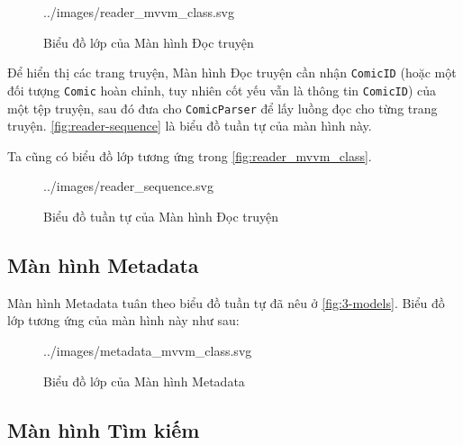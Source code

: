 \documentclass[../../../../thesis]{subfiles}
\begin{document}
\begin{wrapfigure}[8]{r}{10cm}
    \centering
    
        {../images/reader_mvvm_class.svg}
    \caption{Biểu đồ lớp của Màn hình Đọc truyện}
    \label{fig:reader_mvvm_class}
\end{wrapfigure}

Để hiển thị các trang truyện, Màn hình Đọc truyện cần nhận \texttt{ComicID}
(hoặc một đối tượng \texttt{Comic} hoàn chỉnh, tuy nhiên cốt yếu vẫn là thông
tin \texttt{ComicID}) của một tệp truyện, sau đó đưa cho \texttt{ComicParser} để
lấy luồng đọc cho từng trang truyện. \autoref{fig:reader-sequence} là biểu đồ
tuần tự của màn hình này.

Ta cũng có biểu đồ lớp tương ứng trong \autoref{fig:reader_mvvm_class}.

\begin{figure}[H]
    \centering
    
        {../images/reader_sequence.svg}
    \caption{Biểu đồ tuần tự của Màn hình Đọc truyện}
    \label{fig:reader-sequence}
\end{figure}



\subsection{Màn hình Metadata}\label{sec:metadata-design}

Màn hình Metadata tuân theo biểu đồ tuần tự đã nêu ở \autoref{fig:3-models}.
Biểu đồ lớp tương ứng của màn hình này như sau:

\begin{figure}[H]
    \centering
    
        {../images/metadata_mvvm_class.svg}
    \caption{Biểu đồ lớp của Màn hình Metadata}
    \label{fig:metadata_mvvm_class}
\end{figure}



\subsection{Màn hình Tìm kiếm}\label{sec:search-design}
\end{document}
